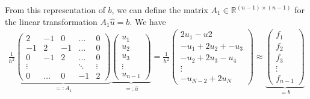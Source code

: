 From this representation of \(b\), we can define the matrix \(A_1 \in \mathbb{R}^{(n-1) \times (n-1)}\) for the linear transformation \(A_1 \hat{u} = b\). We have
\begin{align*}
    \frac{1}{h^2}
    \underbrace{
    \begin{pmatrix}
        2  & -1 &  0 & \dots & 0 \\
        -1 &  2 & -1 & \dots & 0 \\
        0  & -1 &  2 & \dots & 0 \\
        \vdots & & & \ddots & \vdots \\
        0 & \dots & 0 & -1 & 2
    \end{pmatrix}
    }_{=: A_1}
    \underbrace{
    \begin{pmatrix}
        u_1 \\ u_2 \\ u_3 \\ \vdots \\ u_{n-1}
    \end{pmatrix}
    }_{=: \hat{u}}
    =
    \frac{1}{h^2}
    \begin{pmatrix}
        2u_1 - u2 \\
        -u_1 + 2u_2 + -u_3 \\
        -u_2 + 2 u_3 - u_4 \\
        \vdots \\
        -u_{N-2} + 2 u_N
    \end{pmatrix}
    \approx
    \underbrace{
    \begin{pmatrix}
        f_1 \\
        f_2 \\
        f_3 \\
        \vdots \\
        f_{n-1}
    \end{pmatrix}
    }_{=b}
\end{align*}